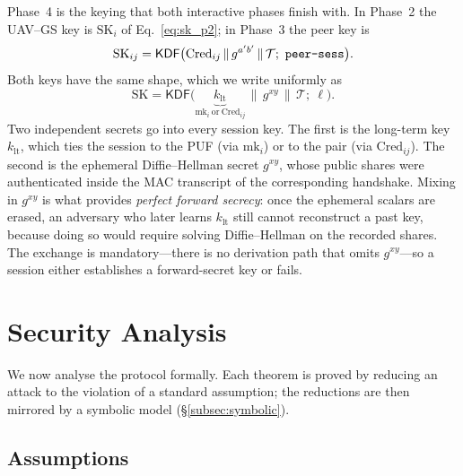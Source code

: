 \documentclass[11pt,a4paper]{article}
\begin{document}
Phase~4 is the keying that both interactive phases finish with. In Phase~2 the
UAV--GS key is $\text{SK}_i$ of Eq.~\eqref{eq:sk_p2}; in Phase~3 the peer key is
\begin{equation}
\text{SK}_{ij} = \mathsf{KDF}\big(\text{Cred}_{ij}\,\|\,g^{a'b'}\,\|\,\mathcal{T};\ \texttt{peer\text{-}sess}\big).
\label{eq:sk_p3}
\end{equation}
Both keys have the same shape, which we write uniformly as
\begin{equation}
\text{SK} = \mathsf{KDF}\big(\underbrace{k_{\text{lt}}}_{\text{mk}_i\ \text{or}\ \text{Cred}_{ij}} \,\|\, g^{xy} \,\|\, \mathcal{T};\ \ell\big).
\label{eq:sk_unified}
\end{equation}
Two independent secrets go into every session key. The first is the long-term
key $k_{\text{lt}}$, which ties the session to the PUF (via $\text{mk}_i$) or to
the pair (via $\text{Cred}_{ij}$). The second is the ephemeral Diffie--Hellman
secret $g^{xy}$, whose public shares were authenticated inside the MAC
transcript of the corresponding handshake. Mixing in $g^{xy}$ is what provides
\emph{perfect forward secrecy}: once the ephemeral scalars are erased, an
adversary who later learns $k_{\text{lt}}$ still cannot reconstruct a past key,
because doing so would require solving Diffie--Hellman on the recorded shares.
The exchange is mandatory---there is no derivation path that omits $g^{xy}$---so
a session either establishes a forward-secret key or fails.

\section{Security Analysis}
\label{sec:security}

We now analyse the protocol formally. Each theorem is proved by reducing an
attack to the violation of a standard assumption; the reductions are then
mirrored by a symbolic model (\S\ref{subsec:symbolic}).

\subsection{Assumptions}
\label{subsec:assumptions}
\end{document}
